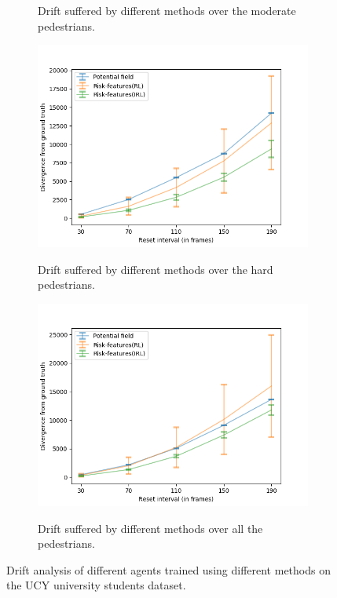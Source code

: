 \begin{figure}[htbp]
\begin{subfigure}{0.5\textwidth}
		\label{subfig:inter_method-drift_analysis_med}
		\caption{Drift suffered by different methods over the moderate pedestrians.}
	\end{subfigure}
	\begin{subfigure}{0.5\textwidth}
		\centering
		\includegraphics[width=\linewidth]{plots/ucy_inter_method_new/drift_hard_ucy_inter_method.png}
		\label{subfig:inter_method-drift_analysis_hard}
		\caption{Drift suffered by different methods over the hard pedestrians.}
	\end{subfigure}
	\begin{subfigure}{0.5\textwidth}
		\centering
		\includegraphics[width=\linewidth]{plots/ucy_inter_method_new/drift_all_ucy_inter_method.png}
		\label{subfig:inter_method-drift_analysis_all}
		\caption{Drift suffered by different methods over all the pedestrians.}
	\end{subfigure}
	\caption{Drift analysis of different agents trained using different methods on the UCY university students dataset.}
\end{figure}


